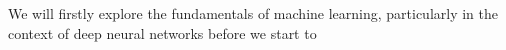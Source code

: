We will firstly explore the fundamentals of machine learning, particularly in the context of deep neural networks before we start to 
